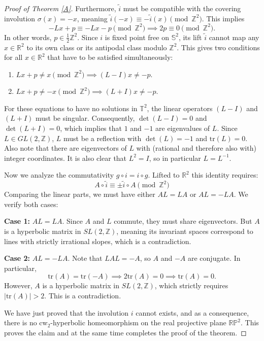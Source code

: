 \documentclass{amsart}
\theoremstyle{plain}
\theoremstyle{definition}
\newcommand{\Z}{\mathbb{Z}}
\newcommand{\R}{\mathbb{R}}
\begin{document}
\begin{proof}[Proof of Theorem \ref{A}]
Furthermore, $\tilde{i}$ must be compatible with the covering involution $\sigma(x) = -x$, meaning $\tilde{i}(-x) \equiv -\tilde{i}(x) \pmod{\mathbb{Z}^2}$. This implies
$$ -Lx + p \equiv -Lx - p \pmod{\mathbb{Z}^2} \implies 2p \equiv 0 \pmod{\mathbb{Z}^2}.$$
In other words, $p\in \frac{1}{2}\Z^2$. Since $i$ is fixed point free on $\mathbb{S}^2$, its lift $\tilde{i}$ cannot map any $x \in \mathbb{R}^2$ to its own class or its antipodal class modulo $\mathbb{Z}^2$. This gives two conditions for all $x \in \mathbb{R}^2$ that have to be satisfied simultaneously:
\begin{enumerate}
    \item $Lx + p %
    \neq x \pmod{\mathbb{Z}^2} \implies (L - I)x %
    \neq -p $.%
    \item $Lx + p %
    \neq -x \pmod{\mathbb{Z}^2} \implies (L + I)x %
    \neq -p $.%
\end{enumerate}
For these equations to have no solutions in $\mathbb{T}^2$, the linear operators $(L - I)$ and $(L + I)$ must be singular. Consequently, $\det(L - I) = 0$ and $\det(L + I) = 0$, which implies that $1$ and $-1$ are eigenvalues of $L$. Since $L \in GL(2, \mathbb{Z})$, $L$ must be a reflection with $\det(L) = -1$ and $\text{tr}(L)=0$.
Also note that there are eigenvectors of $L$ with (rational and therefore also with) integer coordinates.
It is also clear that $L^2=I$, so in particular $L=L^{-1}$. 

Now we analyze the commutativity $g\circ i = i \circ g$. Lifted to 
$\R^2$ this identity requires:
$$ A \circ \tilde{i} \equiv \pm \tilde{i} \circ A \pmod{\mathbb{Z}^2} $$
Comparing the linear parts, we must have either $AL = LA$ or $AL = -LA$. We verify both cases:

\textbf{Case 1:} $AL = LA$. 
Since $A$ and $L$ commute, they must share eigenvectors.  
But $A$ is a hyperbolic matrix in $SL(2, \mathbb{Z})$, meaning its invariant spaces correspond to lines with strictly irrational slopes, which is a contradiction.

\textbf{Case 2:} $AL = -LA$. 
Note that $LAL=-A$, so $A$ and $-A$ are conjugate. In particular,
$$ \text{tr}(A) = \text{tr}(-A) \implies 2\text{tr}(A) = 0 \implies \text{tr}(A) = 0. $$
However, $A$ is a hyperbolic matrix in $SL(2, \mathbb{Z})$, which strictly requires $|\text{tr}(A)| > 2$. This is a contradiction.

We have just proved that the involution $i$ cannot exists, and as a consequence, there is no cw$_2$-hyperbolic homeomorphism
on the real projective plane $\mathbb{RP}^2$. This proves the claim and at the same time completes the proof of the theorem.
\end{proof}
\end{document}
